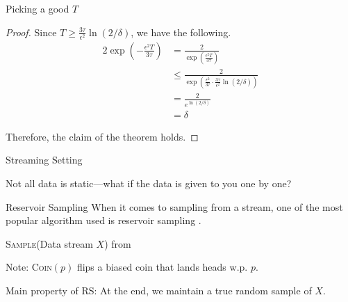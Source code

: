 \begin{frame}{Picking a good \(T\)}
  \begin{proof}
    Since \(T \geq \frac{3\tau}{\epsilon^2}\ln(2/\delta)\), we have the
    following. 
    \[
      \begin{aligned}
        2\exp\left(-\frac{\epsilon^2 T}{3\tau}\right)
          &= \frac{2}{\exp\left(\frac{\epsilon^2 T}{3\tau}\right)} \\
          &\leq \frac{2}{\exp\left(\frac{\epsilon^2}{3\tau} \cdot
            \frac{3\tau}{\epsilon^2}\ln(2/\delta)\right)} \\
          &= \frac{2}{e^{\ln(2/\delta)}} \\
          &= \delta
      \end{aligned}
    \]

    Therefore, the claim of the theorem holds.
  \end{proof}
\end{frame}

\begin{frame}{Streaming Setting}
  \begin{center}
    Not all data is static---what if the data is given to you one by one?
  \end{center}
\end{frame}

\begin{frame}{Reservoir Sampling}
  When it comes to sampling from a stream, one of the most popular algorithm
  used is reservoir sampling \cite{reservoir-vitter}.

  \begin{algorithm}[H]
  \caption{\textsc{Sample}(Data stream \(X\)) from \cite{reservoir-vitter}}
  \begin{algorithmic}
      \EndIf
    \EndFor
  \end{algorithmic}
  \end{algorithm}

  Note: \textsc{Coin}\((p)\) flips a biased coin that lands heads w.p. \(p\).

  Main property of RS: At the end, we maintain a true random sample of \(X\).
\end{frame}

